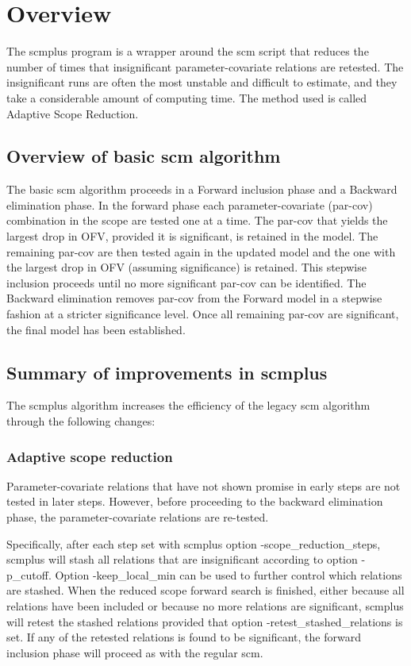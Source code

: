 \documentclass[hideglossary,notoc,hidelof,hidelot,hideTheSignaturePage,hideLinkCurrent,hideloa,pdfLatex,noClient,notitle,hideConfidential]{PMXstyle-20190820}
\begin{document}
\section{Overview}
The scmplus program is a wrapper around the scm script that reduces the number of times
that insignificant parameter-covariate relations are retested. The insignificant runs are often
the most unstable and difficult to estimate, and they take a considerable amount of computing time.
The method used is called Adaptive Scope Reduction.

\subsection{Overview of basic scm algorithm}

The basic scm algorithm proceeds in a Forward inclusion phase and a
Backward elimination phase. In the forward phase each parameter-covariate (par-cov) combination 
in the scope are tested one
at a time. The par-cov that yields the largest drop in OFV, provided it is
significant, is retained in the model. The remaining par-cov are then
tested again in the updated model and the one with the largest drop in
OFV (assuming significance) is retained. This stepwise inclusion
proceeds until no more significant par-cov can be identified. The
Backward elimination removes par-cov from the Forward model in a
stepwise fashion at a stricter significance level. Once all remaining par-cov 
are significant, the final model has been established.


\subsection{Summary of improvements in scmplus}
The scmplus algorithm increases the efficiency of the legacy scm
algorithm through the following changes:
\subsubsection{Adaptive scope reduction} 
Parameter-covariate relations that have
not shown promise in early steps are not tested in later steps. However,
before proceeding to the backward elimination phase, the 
parameter-covariate relations are re-tested. 

Specifically, after each step
set with scmplus option -scope\_reduction\_steps, scmplus will stash all relations that are insignificant
according to option -p\_cutoff. Option -keep\_local\_min can be used to further control which relations
are stashed.
When the reduced scope forward search is finished, either because all relations have been included or
because no more relations are significant, scmplus will retest the stashed relations provided that option
-retest\_stashed\_relations is set. If any of the retested relations is found to be significant,
the forward inclusion phase will proceed as with the regular scm.
\end{document}
